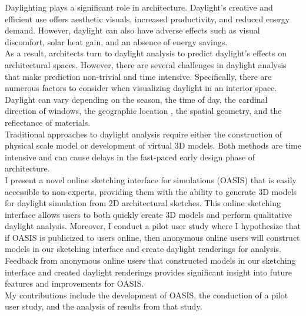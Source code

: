 Daylighting plays a significant role in architecture.
Daylight's creative and efficient use offers aesthetic visuals, increased productivity, and reduced energy demand. 
However, daylight can also have adverse effects such as visual discomfort, solar heat gain, and an absence of energy savings. \\

As a result, architects turn to daylight analysis to predict daylight's effects on architectural spaces. However, there are several challenges in daylight analysis that make prediction non-trivial and time intensive. Specifically, there are numerous factors to consider when visualizing daylight in an interior space. Daylight can vary depending on the season, the time of day, the cardinal direction of windows, the geographic location , the spatial geometry, and the reflectance of materials. \\

Traditional approaches to daylight analysis require either the construction of physical scale model or development of virtual 3D models. Both methods are time intensive and can cause delays in the fast-paced early design phase of architecture. \\

I present a novel online sketching interface for simulations (OASIS) that is easily accessible to non-experts, providing them with the ability to generate 3D models for daylight simulation from 2D architectural sketches. 
This online sketching interface allows users to both quickly create 3D models and perform qualitative daylight analysis.
Moreover, I conduct a pilot user study where I hypothesize that if OASIS is publicized to users online, then anonymous online users will construct models in our sketching interface and create daylight renderings for analysis. Feedback from anonymous online users that constructed models in our sketching interface and created daylight renderings provides significant insight into future features and improvements for OASIS.
\\

My contributions include the development of OASIS, the conduction of a pilot user study, and the analysis of results from that study. \\
